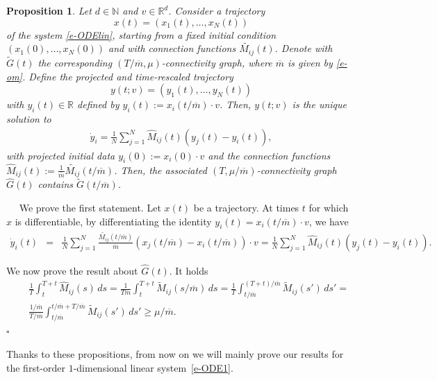 \documentclass[journal]{article}
\newcommand{\R}{\mathbb{R}}
\newtheorem{proposition}[lemma]{Proposition}
\newenvironment{proof}{{\it Proof.}~~}{\hfill$\square$}
\begin{document}
\begin{proposition} \label{p-multid}
 Let $d\in\mathbb{N}$ and $v\in \R^d$. Consider a trajectory $$x(t)=(x_1(t),\ldots,x_N(t))$$ of the system \eqref{e-ODElin}, starting from a fixed initial condition $(x_1(0),\ldots, x_N(0))$ and with connection functions $\widetilde{M_{ij}}(t)$. Denote with $\tilde G(t)$ the corresponding $(T/\overline{m},\mu)$-connectivity graph, where $\overline{m}$ is given by \eqref{e-om}. Define the projected and time-rescaled trajectory $$y(t;v)=(y_1(t),\ldots,y_N(t))$$ with $y_i(t)\in \R$ defined by $y_i(t):=x_i(t/\overline{m})\cdot v$. Then, $y(t;v)$ is the unique solution to 
 \begin{eqnarray}\label{e-ODE1}
 \dot y_i=\frac{1}{N}\sum_{j=1}^N \hat{M}_{ij}(t) (y_j(t)-y_i(t)),
 \end{eqnarray}  with projected initial data $y_i(0):=x_i(0)\cdot v$ and the connection functions $\hat M_{ij}(t):=\frac{1}{\overline{m}}\widetilde{M_{ij}}(t/\overline{m})$. Then, the associated $(T,\mu/\overline{m})$-connectivity graph $\hat G(t)$ contains $\tilde G(t/\overline{m})$.
\end{proposition}
\begin{proof} We prove the first statement. Let $x(t)$ be a trajectory. At times $t$ for which $x$ is differentiable, by differentiating the identity $y_i(t)=x_i(t/\overline{m})\cdot v$, we have
\begin{eqnarray}
\dot y_i(t) &= &\frac{1}{N}\sum_{j=1}^N\frac{\widetilde{M_{ij}}(t/\overline{m})}{\overline{m}}(x_j(t/\overline{m})-x_i(t/\overline{m}))\cdot v=\frac{1}{N}\sum_{j=1}^N \hat M_{ij}(t)(y_j(t)-y_i(t)).\label{e:connectionproj}
\end{eqnarray}

We now prove the result about $\hat G(t)$. It holds
\begin{eqnarray*}
&&\frac{1}{T} \int_t^{T+t} \hat M_{ij}(s)\,ds=\frac{1}{T\overline{m}} \int_t^{T+t} \widetilde M_{ij}(s/\overline{m})\,ds=\frac{1}{T} \int_{t/\overline{m}}^{(T+t)/\overline{m}} \widetilde M_{ij}(s')\,ds'=\\
&&\frac{1/\overline{m}}{T/\overline{m}} \int_{t/\overline{m}}^{t/\overline{m}+T/\overline{m}} \widetilde M_{ij}(s')\,ds'\geq \mu/\overline{m}.
\end{eqnarray*}
\end{proof}

Thanks to these propositions, from now on we will mainly prove our results for the first-order 
$1$-dimensional linear system~\eqref{e-ODE1}.
\end{document}
